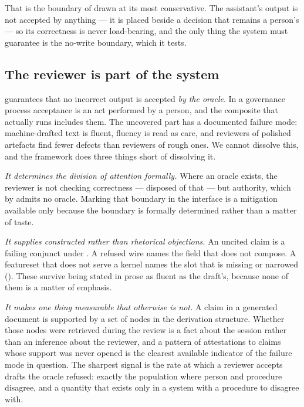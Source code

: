 \documentclass[11pt,a4paper]{article}
\renewcommand{\_}{\oldunderscore\allowbreak}
\theoremstyle{plain}
\theoremstyle{definition}
\theoremstyle{definition}
\theoremstyle{remark}
\begin{document}
That is the boundary of  drawn at its most conservative. The assistant's output is
not accepted by anything --- it is placed beside a decision that remains a person's --- so its correctness is
never load-bearing, and the only thing the system must guarantee is the no-write boundary, which it tests.

\subsection{The reviewer is part of the system}\label{sec:reviewer}

 guarantees that no incorrect output is accepted \emph{by the oracle}. In a governance
process acceptance is an act performed by a person, and the composite that actually runs includes them. The
uncovered part has a documented failure mode: machine-drafted text is fluent, fluency is read as care, and
reviewers of polished artefacts find fewer defects than reviewers of rough ones. We cannot dissolve this, and
the framework does three things short of dissolving it.

\emph{It determines the division of attention formally.} Where an oracle exists, the reviewer is not checking
correctness ---  disposed of that --- but authority, which by 
admits no oracle. Marking that boundary in the interface is a mitigation available only because the boundary
is formally determined rather than a matter of taste.

\emph{It supplies constructed rather than rhetorical objections.} An uncited claim is a failing conjunct
under . A refused wire names the field that does not compose. A featureset that does not
serve a kernel names the slot that is missing or narrowed (). These survive being
stated in prose as fluent as the draft's, because none of them is a matter of emphasis.

\emph{It makes one thing measurable that otherwise is not.} A claim in a generated document is supported by a
set of nodes in the derivation structure. Whether those nodes were retrieved during the review is a fact
about the session rather than an inference about the reviewer, and a pattern of attestations to claims whose
support was never opened is the clearest available indicator of the failure mode in question. The sharpest
signal is the rate at which a reviewer accepts drafts the oracle refused: exactly the population where person
and procedure disagree, and a quantity that exists only in a system with a procedure to disagree with.
\end{document}
